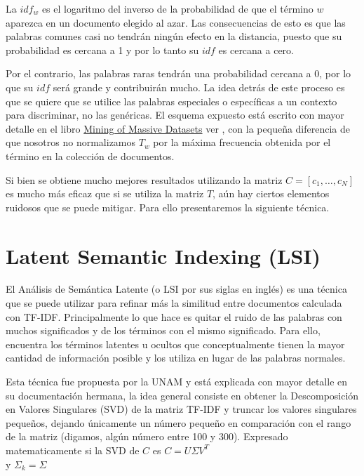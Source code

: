 La $idf_w$ es el logaritmo del inverso de la probabilidad de que el término $w$ aparezca en un documento elegido al azar. 
Las consecuencias de esto es que las palabras comunes casi no tendrán ningún efecto en la distancia, puesto que su probabilidad es cercana a 1 y por lo tanto su $idf$ es cercana a cero. 

Por el contrario, las palabras raras tendrán una probabilidad cercana a 0, por lo que su $idf$ será grande y contribuirán mucho. 
La idea detrás de este proceso es que se quiere que se utilice las palabras especiales o específicas a un contexto para discriminar, no las genéricas.
El esquema expuesto está escrito con mayor detalle en el libro \href{http://www.mmds.org}{Mining of Massive Datasets} ver \citep{leskovec2014mining},
con la pequeña diferencia de que nosotros no normalizamos $T_w$ por la máxima frecuencia obtenida por el término en la colección de documentos.


Si bien se obtiene mucho mejores resultados utilizando la matriz $C = [c_1, \dots, c_N]$ es mucho más eficaz que si se utiliza la matriz $T$, aún hay ciertos elementos ruidosos que se puede mitigar. Para ello presentaremos la siguiente técnica.

\section{Latent Semantic Indexing (LSI)}

El Análisis de Semántica Latente (o LSI por sus siglas en inglés) es una técnica que se puede utilizar para refinar  más la similitud entre documentos calculada con TF-IDF.
Principalmente lo que hace es quitar el ruido de las palabras con muchos significados y de los términos con el mismo significado.
Para ello, encuentra los términos latentes u ocultos que conceptualmente tienen la mayor cantidad de información 
posible y los utiliza en lugar de las palabras normales.

Esta técnica fue propuesta por la UNAM y está explicada con mayor detalle en su documentación hermana, 
la idea general consiste en obtener la Descomposición en Valores Singulares (SVD) 
de la matriz TF-IDF y truncar los valores singulares pequeños,
dejando únicamente un número pequeño en comparación con el rango de la matriz (digamos, algún número entre 100 y 300).
Expresado matematicamente si la SVD de $C$ es 
$C = U \Sigma V^T$ \\

y $\Sigma_k = \Sigma$\\


